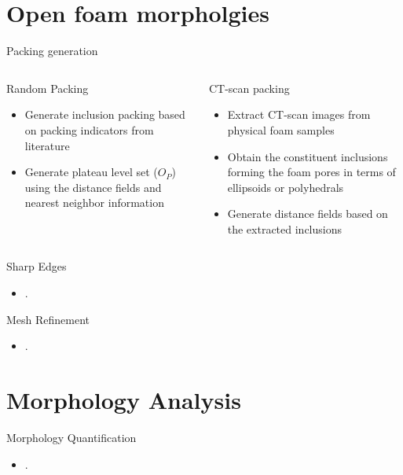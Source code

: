 \documentclass[aspectratio=169,11pt]{beamer}
\begin{document}
\section{Open foam morpholgies}
\begin{frame}{Packing generation}
	\begin{columns}[onlytextwidth]
		\begin{block}{Random Packing}
			\begin{itemize}
				\item Generate inclusion packing based on packing indicators from literature
				\item Generate plateau level set ($ O_P $) using the distance fields and nearest neighbor information
			\end{itemize}
		\end{block}
		\begin{block}{CT-scan packing}
			\begin{itemize}
				\item Extract CT-scan images from physical foam samples
				\item Obtain the constituent inclusions forming the foam pores in terms of ellipsoids or polyhedrals
				\item Generate distance fields based on the extracted inclusions
			\end{itemize}
		\end{block}
	\end{columns}
\end{frame}

\begin{frame}{Sharp Edges}
	\begin{itemize}
		\item .
	\end{itemize}
\end{frame}

\begin{frame}{Mesh Refinement}
\begin{itemize}
	\item .
\end{itemize}
\end{frame}

\section{Morphology Analysis}
\begin{frame}{Morphology Quantification}
\begin{itemize}
	\item .
\end{itemize}
\end{frame}
\end{document}
